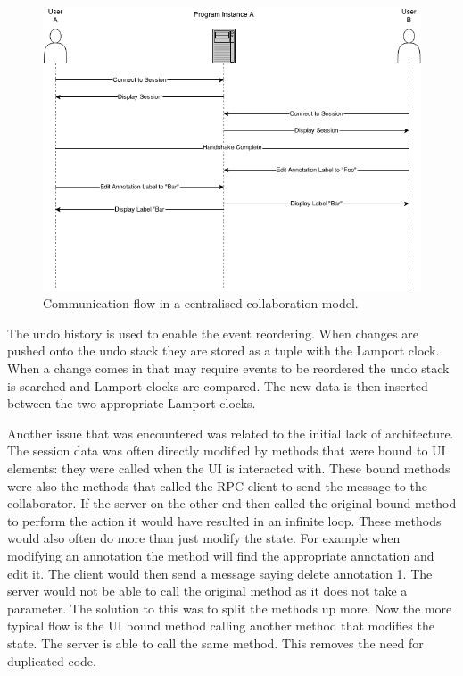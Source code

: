 \begin{figure}[h!]
    \centering
    \includegraphics[width=\textwidth]{images/collaboration_single_instance.png}
    \caption{Communication flow in a centralised collaboration model.}
    \label{fig:collab_mixup_fix_2}
\end{figure}

The undo history is used to enable the event reordering.  When changes are pushed onto the undo stack they are stored as a tuple with the Lamport clock.  When a change comes in that may require events to be reordered the undo stack is searched and Lamport clocks are compared.  The new data is then inserted between the two appropriate Lamport clocks.

Another issue that was encountered was related to the initial lack of architecture.  The session data was often directly modified by methods that were bound to \ac{UI} elements: they were called when the \ac{UI} is interacted with.  These bound methods were also the methods that called the \ac{RPC} client to send the message to the collaborator. If the server on the other end then called the original bound method to perform the action it would have resulted in an infinite loop.  These methods would also often do more than just modify the state. For example when modifying an annotation the method will find the appropriate annotation and edit it.  The client would then send a message saying delete annotation 1.  The server would not be able to call the original method as it does not take a parameter.  The solution to this was to split the methods up more.  Now the more typical flow is the \ac{UI} bound method calling another method that modifies the state.  The server is able to call the same method.  This removes the need for duplicated code.

